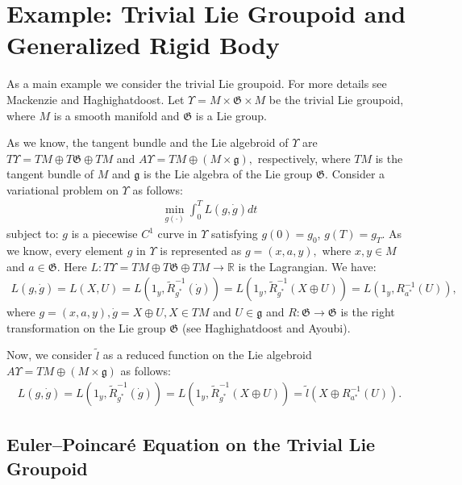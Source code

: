 \documentclass{article}
\begin{document}
\section{Example: Trivial Lie Groupoid and Generalized Rigid Body}

As a main example we consider the trivial Lie groupoid. For more details see Mackenzie and Haghighatdoost.
Let $\Upsilon = M \times \mathfrak{G} \times M$ be the trivial Lie groupoid, where $M$ is a smooth manifold and $\mathfrak{G}$ is a Lie group. 

As we know, the tangent bundle and the Lie algebroid of $\Upsilon$ are $T\Upsilon = TM \oplus T \mathfrak{G} \oplus TM$ and $A\Upsilon = TM \oplus (M \times \mathfrak{g}),$ respectively, where $TM$ is the tangent bundle of $M$ and $\mathfrak{g}$ is the Lie algebra of the Lie group $\mathfrak{G}.$
Consider a variational problem on $\Upsilon$ as follows:
\begin{eqnarray}\label{EVPQ}
\min_{g(\cdot)}\int^T_0L(g, \dot{g})dt
\end{eqnarray}
subject to: $g$ is a piecewise $C^1$ curve in $\Upsilon$ satisfying $g(0)=g_0$, $g(T)=g_T.$
As we know, every element $g$ in $\Upsilon$ is represented as $g=(x, a, y),$ where $x , y \in M$ and $a\in \mathfrak{G}.$ Here $L:T\Upsilon=TM \oplus T \mathfrak{G}\oplus TM\to \mathbb{R}$ is the Lagrangian. We have: 
\begin{eqnarray}
L(g, \dot{g})=L(X, U)= L(1_y, \tilde{R}^{-1}_{g^*}(\dot{g})) = L(1_y, \tilde{R}^{-1}_{g^*}(X\oplus U))=L(1_y, R^{-1}_{a^*}(U)),
\end{eqnarray}
where $g=(x, a, y), \dot{g}=X\oplus U, X\in TM$ and $U\in \mathfrak{g}$ and $R: \mathfrak{G}\to \mathfrak{G}$ is the right transformation on the Lie group $\mathfrak{G}$ (see Haghighatdoost and Ayoubi).

Now, we consider $\tilde{l}$ as a reduced function on the Lie algebroid $A\Upsilon= TM\oplus (M\times \mathfrak{g})$ as follows: 
\begin{eqnarray}
L(g, \dot{g})=L(1_y, \tilde{R}^{-1}_{g^*}(\dot{g})) = L(1_y, \tilde{R}^{-1}_{g^*}(X\oplus U)) = \tilde{l}(X\oplus R^{-1}_{a^*}(U)).
\end{eqnarray}

\subsection{Euler--Poincar\'e Equation on the Trivial Lie Groupoid}
\end{document}
